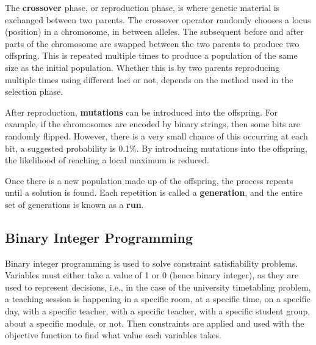 \documentclass[a4paper, 12pt]{report}
\begin{document}
The \textbf{crossover} phase, or reproduction phase, is where genetic material
is exchanged between two parents. The crossover operator randomly chooses a
locus (position) in a chromosome, in between alleles. The subsequent before and
after parts of the chromosome are swapped between the two parents to produce
two offspring. This is repeated multiple times to produce a population of the
same size as the initial population. Whether this is by two parents reproducing
multiple times using different loci or not, depends on the method used in the
selection phase.

After reproduction, \textbf{mutations} can be introduced into the offspring. 
For example, if the chromosomes are encoded by binary strings, then some bits 
are randomly flipped. However, there is a very small chance of this occurring 
at each bit, a suggested probability is 0.1\%. By introducing mutations into 
the offspring, the likelihood of reaching a local maximum is reduced.

Once there is a new population made up of the offspring, the process repeats 
until a solution is found. Each repetition is called a \textbf{generation}, and 
the entire set of generations is known as a \textbf{run}.

\subsection{Binary Integer Programming}

Binary integer programming is used to solve constraint satisfiability problems.
Variables must either take a value of 1 or 0 (hence binary integer), as they 
are used to represent decisions, i.e., in the case of the university 
timetabling problem, a teaching session is happening in a specific room, at a 
specific time, on a specific day, with a specific teacher, with a specific 
teacher, with a specific student group, about a specific module, or not. Then 
constraints are applied and used with the objective function to find what value 
each variables takes.
\end{document}
